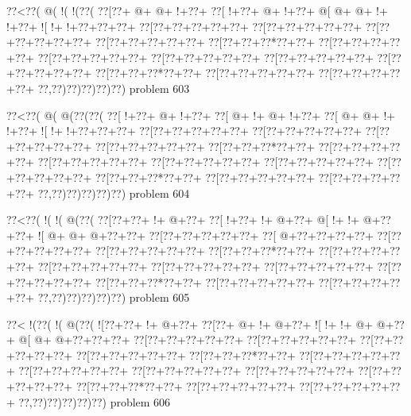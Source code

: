 \vbox{\vbox{\goo
\0??<\0??(\- @(\- !(\- !(\0??(
\0??[\0??+\- @+\- @+\- !+\0??+
\0??[\- !+\0??+\- @+\- !+\0??+
\- @[\- @+\- @+\- !+\- !+\0??+
\- ![\- !+\- !+\0??+\0??+\0??+
\0??[\0??+\0??+\0??+\0??+\0??+
\0??[\0??+\0??+\0??+\0??+\0??+
\0??[\0??+\0??+\0??+\0??+\0??+
\0??[\0??+\0??+\0??+\0??+\0??+
\0??[\0??+\0??+\0??*\0??+\0??+
\0??[\0??+\0??+\0??+\0??+\0??+
\0??[\0??+\0??+\0??+\0??+\0??+
\0??[\0??+\0??+\0??+\0??+\0??+
\0??[\0??+\0??+\0??+\0??+\0??+
\0??[\0??+\0??+\0??+\0??+\0??+
\0??[\0??+\0??+\0??*\0??+\0??+
\0??[\0??+\0??+\0??+\0??+\0??+
\0??[\0??+\0??+\0??+\0??+\0??+
\0??,\0??)\0??)\0??)\0??)\0??)
}
\hfil problem 603\hfil\break
}

\vbox{\vbox{\goo
\0??<\0??(\- @(\- @(\0??(\0??(
\0??[\- !+\0??+\- @+\- !+\0??+
\0??[\- @+\- !+\- @+\- !+\0??+
\0??[\- @+\- @+\- !+\- !+\0??+
\- ![\- !+\- !+\0??+\0??+\0??+
\0??[\0??+\0??+\0??+\0??+\0??+
\0??[\0??+\0??+\0??+\0??+\0??+
\0??[\0??+\0??+\0??+\0??+\0??+
\0??[\0??+\0??+\0??+\0??+\0??+
\0??[\0??+\0??+\0??*\0??+\0??+
\0??[\0??+\0??+\0??+\0??+\0??+
\0??[\0??+\0??+\0??+\0??+\0??+
\0??[\0??+\0??+\0??+\0??+\0??+
\0??[\0??+\0??+\0??+\0??+\0??+
\0??[\0??+\0??+\0??+\0??+\0??+
\0??[\0??+\0??+\0??*\0??+\0??+
\0??[\0??+\0??+\0??+\0??+\0??+
\0??[\0??+\0??+\0??+\0??+\0??+
\0??,\0??)\0??)\0??)\0??)\0??)
}
\hfil problem 604\hfil\break
}

\vbox{\vbox{\goo
\0??<\0??(\- !(\- !(\- @(\0??(
\0??[\0??+\0??+\- !+\- @+\0??+
\0??[\- !+\0??+\- !+\- @+\0??+
\- @[\- !+\- !+\- @+\0??+\0??+
\- ![\- @+\- @+\- @+\0??+\0??+
\0??[\0??+\0??+\0??+\0??+\0??+
\0??[\- @+\0??+\0??+\0??+\0??+
\0??[\0??+\0??+\0??+\0??+\0??+
\0??[\0??+\0??+\0??+\0??+\0??+
\0??[\0??+\0??+\0??*\0??+\0??+
\0??[\0??+\0??+\0??+\0??+\0??+
\0??[\0??+\0??+\0??+\0??+\0??+
\0??[\0??+\0??+\0??+\0??+\0??+
\0??[\0??+\0??+\0??+\0??+\0??+
\0??[\0??+\0??+\0??+\0??+\0??+
\0??[\0??+\0??+\0??*\0??+\0??+
\0??[\0??+\0??+\0??+\0??+\0??+
\0??[\0??+\0??+\0??+\0??+\0??+
\0??,\0??)\0??)\0??)\0??)\0??)
}
\hfil problem 605\hfil\break
}

\vbox{\vbox{\goo
\0??<\- !(\0??(\- !(\- @(\0??(
\- ![\0??+\0??+\- !+\- @+\0??+
\0??[\0??+\- @+\- !+\- @+\0??+
\- ![\- !+\- !+\- @+\- @+\0??+
\- @[\- @+\- @+\0??+\0??+\0??+
\0??[\0??+\0??+\0??+\0??+\0??+
\0??[\0??+\0??+\0??+\0??+\0??+
\0??[\0??+\0??+\0??+\0??+\0??+
\0??[\0??+\0??+\0??+\0??+\0??+
\0??[\0??+\0??+\0??*\0??+\0??+
\0??[\0??+\0??+\0??+\0??+\0??+
\0??[\0??+\0??+\0??+\0??+\0??+
\0??[\0??+\0??+\0??+\0??+\0??+
\0??[\0??+\0??+\0??+\0??+\0??+
\0??[\0??+\0??+\0??+\0??+\0??+
\0??[\0??+\0??+\0??*\0??+\0??+
\0??[\0??+\0??+\0??+\0??+\0??+
\0??[\0??+\0??+\0??+\0??+\0??+
\0??,\0??)\0??)\0??)\0??)\0??)
}
\hfil problem 606\hfil\break
}

